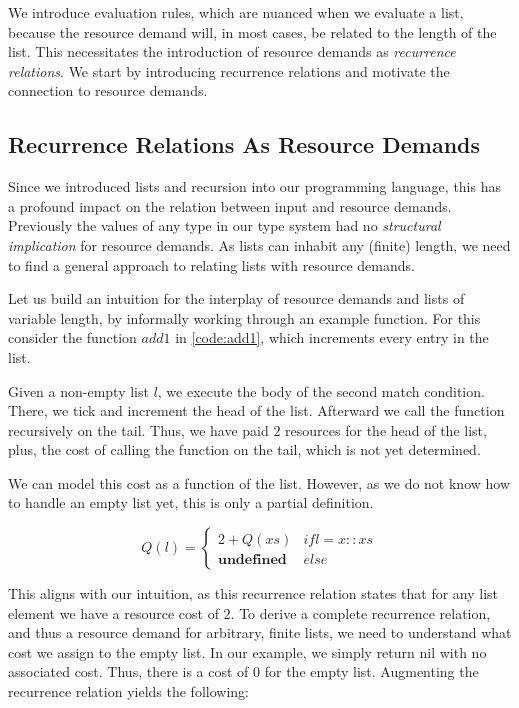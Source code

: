 We introduce evaluation rules, which are nuanced when we evaluate a list, because the resource demand will, in most cases, be related to the length of the list. This necessitates the introduction of resource demands as \emph{recurrence relations}. We start by introducing recurrence relations and motivate the connection to resource demands. 

\subsection{Recurrence Relations As Resource Demands}

Since we introduced lists and recursion into our programming language, this has a profound impact on the relation between input and resource demands. Previously the values of any type in our type system had no \emph{structural implication} for resource demands. As lists can inhabit any (finite) length, we need to find a general approach to relating lists with resource demands. 

Let us build an intuition for the interplay of resource demands and lists of variable length, by informally working through an example function. For this consider the function \(add1\) in \cref{code:add1}, which increments every entry in the list.

Given a non-empty list \(l\), we execute the body of the second match condition. There, we tick and increment the head of the list. Afterward we call the function recursively on the tail. Thus, we have paid \(2\) resources for the head of the list, plus, the cost of calling the function on the tail, which is not yet determined.

We can model this cost as a function of the list. However, as we do not know how to handle an empty list yet, this is only a partial definition.

\[
   Q(l) = \begin{cases*}
      2 + Q(xs)            & if l = x :: xs\\
      \textbf{undefined}   & else
   \end{cases*}
\]

This aligns with our intuition, as this recurrence relation states that for any list element we have a resource cost of \(2\). To derive a complete recurrence relation, and thus a resource demand for arbitrary, finite lists, we need to understand what cost we assign to the empty list. In our example, we simply return nil with no associated cost. Thus, there is a cost of \(0\) for the empty list. Augmenting the recurrence relation yields the following:


